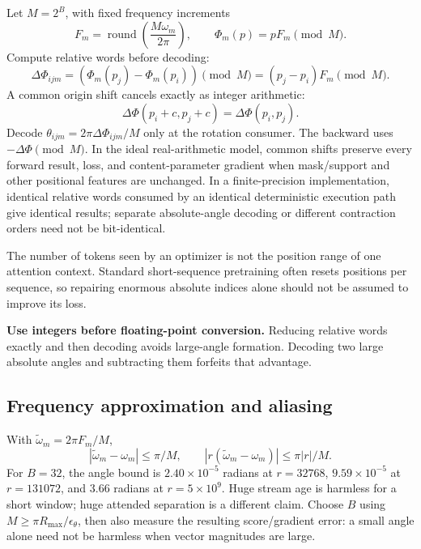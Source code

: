\documentclass[11pt]{article}
\begin{document}
Let $M=2^B$, with fixed frequency increments
\begin{equation}
 F_m=\operatorname{round}\left(\frac{M\omega_m}{2\pi}\right),\qquad
 \Phi_m(p)=pF_m\pmod M.
\end{equation}
Compute relative words before decoding:
\begin{equation}
 \Delta\Phi_{ijm}=(\Phi_m(p_j)-\Phi_m(p_i))\pmod M
 =(p_j-p_i)F_m\pmod M.
\end{equation}
A common origin shift cancels exactly as integer arithmetic:
\begin{equation}
 \Delta\Phi(p_i+c,p_j+c)=\Delta\Phi(p_i,p_j).
\end{equation}
Decode $\theta_{ijm}=2\pi\Delta\Phi_{ijm}/M$ only at the rotation consumer. The backward uses $-\Delta\Phi\pmod M$. In the ideal real-arithmetic model, common shifts preserve every forward result, loss, and content-parameter gradient when mask/support and other positional features are unchanged. In a finite-precision implementation, identical relative words consumed by an identical deterministic execution path give identical results; separate absolute-angle decoding or different contraction orders need not be bit-identical.

The number of tokens seen by an optimizer is not the position range of one attention context. Standard short-sequence pretraining often resets positions per sequence, so repairing enormous absolute indices alone should not be assumed to improve its loss.

\textbf{Use integers before floating-point conversion.} Reducing relative words exactly and then decoding avoids large-angle formation. Decoding two large absolute angles and subtracting them forfeits that advantage.

\subsection{Frequency approximation and aliasing}

With $\widetilde\omega_m=2\pi F_m/M$,
\begin{equation}
 |\widetilde\omega_m-\omega_m|\leq\pi/M,\qquad
 |r(\widetilde\omega_m-\omega_m)|\leq\pi|r|/M.
\end{equation}
For $B=32$, the angle bound is $2.40\times10^{-5}$ radians at $r=32768$, $9.59\times10^{-5}$ at $r=131072$, and $3.66$ radians at $r=5\times10^9$. Huge stream age is harmless for a short window; huge attended separation is a different claim. Choose $B$ using $M\geq\pi R_{\max}/\epsilon_\theta$, then also measure the resulting score/gradient error: a small angle alone need not be harmless when vector magnitudes are large.
\end{document}
